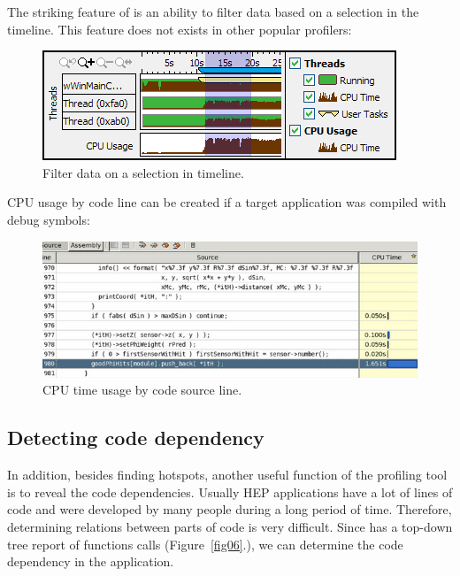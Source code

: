 \documentclass[a4paper]{jpconf}
\begin{document}
The striking feature of \amp is an ability to filter data based on a selection in the timeline. This feature 
does not exists in other popular profilers:

\begin{figure}[H]
\begin{minipage}{\textwidth}
\includegraphics[]{figs/fig04.png}
\caption{\label{fig04}Filter data on a selection in timeline.}
\end{minipage}
\end{figure}

CPU usage by code line can be created if a target application was compiled with debug symbols:

\begin{figure}[H]
\begin{minipage}{\textwidth}
\includegraphics[width=\textwidth]{figs/fig05.png}
\caption{\label{fig05}CPU time usage by code source line.}
\end{minipage}
\end{figure}

\subsection{Detecting code dependency}

In addition, besides finding hotspots, another useful function of the profiling tool is to reveal the code dependencies. 
Usually HEP applications have a lot of lines of code and were developed by many people during a long period of time. 
Therefore, determining relations between parts of code is very difficult. Since \amp  has a top-down tree report of 
functions calls (Figure~\ref{fig06}.),  we can determine the code dependency in the application.
\end{document}
